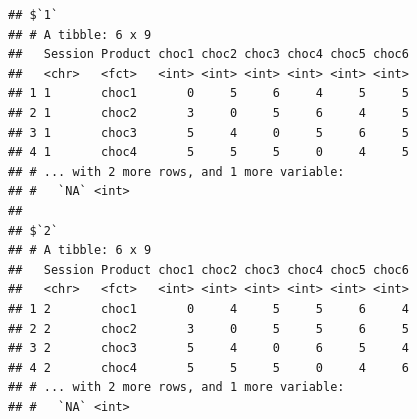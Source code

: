 \documentclass[
]{krantz}
\makeatletter
\newenvironment{Shaded}{\begin{snugshade}}{\end{snugshade}}
\newcommand{\AttributeTok}[1]{\textcolor[rgb]{0.61,0.61,0.61}{#1}}
\newcommand{\DecValTok}[1]{\textcolor[rgb]{0.06,0.06,0.06}{#1}}
\newcommand{\FunctionTok}[1]{\textcolor[rgb]{0,0,0}{#1}}
\newcommand{\NormalTok}[1]{#1}
\newcommand{\SpecialCharTok}[1]{\textcolor[rgb]{0,0,0}{#1}}
\newcommand{\StringTok}[1]{\textcolor[rgb]{0.5,0.5,0.5}{#1}}
\newenvironment{kframe}{%
\medskip{}
\setlength{\fboxsep}{.8em}
 \def\at@end@of@kframe{}%
 \ifinner\ifhmode%
  \def\at@end@of@kframe{\end{minipage}}%
  \begin{minipage}{\columnwidth}%
 \fi\fi%
 \def\FrameCommand##1{\hskip\@totalleftmargin \hskip-\fboxsep
 \colorbox{shadecolor}{##1}\hskip-\fboxsep
     \hskip-\linewidth \hskip-\@totalleftmargin \hskip\columnwidth}%
 \MakeFramed {\advance\hsize-\width
   \@totalleftmargin\z@ \linewidth\hsize
   \@setminipage}}%
 {\par\unskip\endMakeFramed%
 \at@end@of@kframe}
\renewenvironment{Shaded}{\begin{kframe}}{\end{kframe}}
\makeatother
\begin{document}
\begin{Shaded}
\end{Shaded}

\begin{verbatim}
## $`1`
## # A tibble: 6 x 9
##   Session Product choc1 choc2 choc3 choc4 choc5 choc6
##   <chr>   <fct>   <int> <int> <int> <int> <int> <int>
## 1 1       choc1       0     5     6     4     5     5
## 2 1       choc2       3     0     5     6     4     5
## 3 1       choc3       5     4     0     5     6     5
## 4 1       choc4       5     5     5     0     4     5
## # ... with 2 more rows, and 1 more variable:
## #   `NA` <int>
## 
## $`2`
## # A tibble: 6 x 9
##   Session Product choc1 choc2 choc3 choc4 choc5 choc6
##   <chr>   <fct>   <int> <int> <int> <int> <int> <int>
## 1 2       choc1       0     4     5     5     6     4
## 2 2       choc2       3     0     5     5     6     5
## 3 2       choc3       5     4     0     6     5     4
## 4 2       choc4       5     5     5     0     4     6
## # ... with 2 more rows, and 1 more variable:
## #   `NA` <int>
\end{verbatim}
\end{document}
